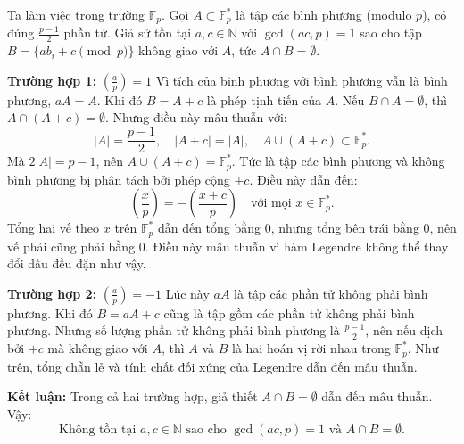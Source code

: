\documentclass[../08-quadratic-residues.tex]{subfiles}
\begin{document}
\begin{soln}\footnotemark
	Ta làm việc trong trường \( \mathbb{F}_p \). Gọi \( A \subset \mathbb{F}_p^* \) là tập các bình phương (modulo \(p\)), có đúng \( \frac{p-1}{2} \) phần tử.  
	Giả sử tồn tại \( a, c \in \mathbb{N} \) với \( \gcd(ac, p) = 1 \) sao cho tập \( B = \{ ab_i + c \pmod{p} \} \) không giao với \( A \), tức \( A \cap B = \emptyset \).

	\textbf{Trường hợp 1:} \( \left( \frac{a}{p} \right) = 1 \)  
	Vì tích của bình phương với bình phương vẫn là bình phương, \( aA = A \). Khi đó \( B = A + c \) là phép tịnh tiến của \( A \). Nếu \( B \cap A = \emptyset \), thì \( A \cap (A + c) = \emptyset \). Nhưng điều này mâu thuẫn với:
	\[
		|A| = \frac{p-1}{2},\quad |A + c| = |A|,\quad A \cup (A + c) \subset \mathbb{F}_p^*.
	\]
	Mà \( 2|A| = p - 1 \), nên \( A \cup (A + c) = \mathbb{F}_p^* \). Tức là tập các bình phương và không bình phương bị phân tách bởi phép cộng \( +c \). Điều này dẫn đến:
	\[
		\left( \frac{x}{p} \right) = - \left( \frac{x + c}{p} \right)\quad \text{với mọi } x \in \mathbb{F}_p^*.
	\]
	Tổng hai vế theo \( x \) trên \( \mathbb{F}_p^* \) dẫn đến tổng bằng 0, nhưng tổng bên trái bằng 0, nên vế phải cũng phải bằng 0. Điều này mâu thuẫn vì hàm Legendre không thể thay đổi dấu đều đặn như vậy.

	\textbf{Trường hợp 2:} \( \left( \frac{a}{p} \right) = -1 \)  
	Lúc này \( aA \) là tập các phần tử không phải bình phương. Khi đó \( B = aA + c \) cũng là tập gồm các phần tử không phải bình phương.  
	Nhưng số lượng phần tử không phải bình phương là \( \frac{p-1}{2} \), nên nếu dịch bởi \( +c \) mà không giao với \( A \), thì \( A \) và \( B \) là hai hoán vị rời nhau trong \( \mathbb{F}_p^* \). Như trên, tổng chẵn lẻ và tính chất đối xứng của Legendre dẫn đến mâu thuẫn.

	\textbf{Kết luận:} Trong cả hai trường hợp, giả thiết \( A \cap B = \emptyset \) dẫn đến mâu thuẫn. Vậy:
	\[
		\boxed{\text{Không tồn tại } a, c \in \mathbb{N} \text{ sao cho } \gcd(ac, p) = 1 \text{ và } A \cap B = \emptyset.}
	\]
\end{soln}

\end{document}
